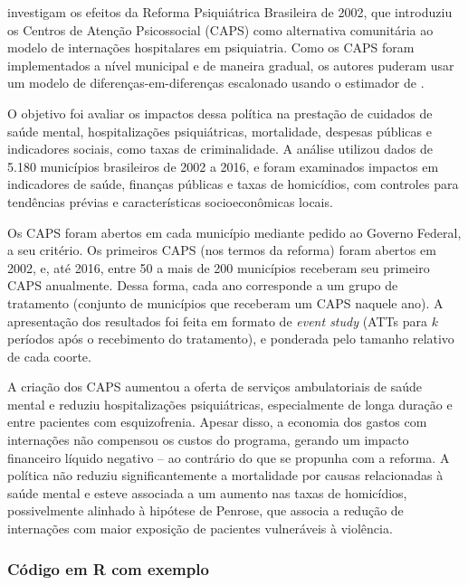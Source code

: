 \documentclass[portugues]{article}
\begin{document}
\begin{boxaplicado}
\cite{diasfontes2024} investigam os efeitos da Reforma Psiquiátrica Brasileira de 2002, que introduziu os Centros de Atenção Psicossocial (CAPS) como alternativa comunitária ao modelo de internações hospitalares em psiquiatria. Como os CAPS foram implementados a nível municipal e de maneira gradual, os autores puderam usar um modelo de diferenças-em-diferenças escalonado usando o estimador de \cite{de2020two}.

O objetivo foi avaliar os impactos dessa política na prestação de cuidados de saúde mental, hospitalizações psiquiátricas, mortalidade, despesas públicas e indicadores sociais, como taxas de criminalidade.  A análise utilizou dados de 5.180 municípios brasileiros de 2002 a 2016, e foram examinados impactos em indicadores de saúde, finanças públicas e taxas de homicídios, com controles  para tendências prévias e características socioeconômicas locais.

Os CAPS foram abertos em cada município mediante pedido ao Governo Federal, a seu critério. Os primeiros CAPS (nos termos da reforma) foram abertos em 2002, e, até 2016, entre 50 a mais de 200 municípios receberam seu primeiro CAPS anualmente. Dessa forma, cada ano corresponde a um grupo de tratamento (conjunto de municípios que receberam um CAPS naquele ano). A apresentação dos resultados foi feita em formato de \textit{event study} (ATTs para $k$ períodos após o recebimento do tratamento), e ponderada pelo tamanho relativo de cada coorte. 

A criação dos CAPS aumentou a oferta de serviços ambulatoriais de saúde mental e reduziu hospitalizações psiquiátricas, especialmente de longa duração e entre pacientes com esquizofrenia. Apesar disso, a economia dos gastos com internações não compensou os custos do programa, gerando um impacto financeiro líquido negativo – ao contrário do que se propunha com a reforma. A política não reduziu significantemente a mortalidade por causas relacionadas à saúde mental e esteve associada a um aumento nas taxas de homicídios, possivelmente alinhado à hipótese de Penrose, que associa a redução de internações com maior exposição de pacientes vulneráveis à violência.

\end{boxaplicado}



\subsubsection{Código em R com exemplo}
\end{document}
